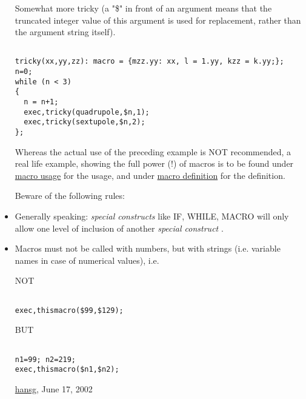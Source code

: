 \begin{itemize}
Somewhat more tricky (a "\$" in front of an argument means that the truncated integer value of this argument is used for replacement, rather than the argument string itself). 
\begin{verbatim}

tricky(xx,yy,zz): macro = {mzz.yy: xx, l = 1.yy, kzz = k.yy;};
n=0;
while (n < 3)
{
  n = n+1;
  exec,tricky(quadrupole,$n,1);
  exec,tricky(sextupole,$n,2);
};
\end{verbatim} Whereas the actual use of the preceding example is NOT recommended,
a real life example, showing the full power (!) of macros is to be
found under \href{foot.html}{macro usage} for the usage, and
under \href{foot.html#macro}{macro definition} for the
definition.


 Beware of the following rules:

	\item Generally speaking: \textit{ special constructs } like IF, WHILE,
MACRO will only allow one level of inclusion of another \textit{
special construct }.

	\item  Macros must not be called with numbers, but with strings
(i.e. variable names in case of numerical values), i.e. 



NOT

\begin{verbatim}

exec,thismacro($99,$129);
\end{verbatim}
BUT

\begin{verbatim}

n1=99; n2=219;
exec,thismacro($n1,$n2);
\end{verbatim}\href{http://www.cern.ch/Hans.Grote/hansg_sign.html}{hansg},
June 17, 2002
\end{itemize}
